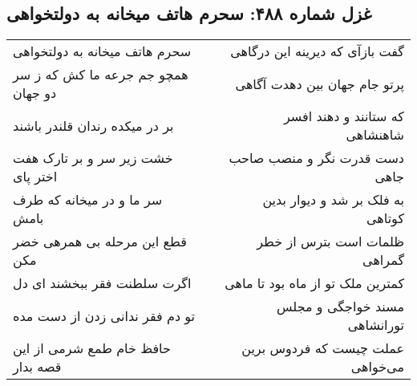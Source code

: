 \begin{center}
\section*{غزل شماره ۴۸۸: سحرم هاتف میخانه به دولتخواهی}
\label{sec:sh488}
\begin{longtable}{l p{0.5cm} r}
سحرم هاتف میخانه به دولتخواهی
&&
گفت بازآی که دیرینه این درگاهی
\\
همچو جم جرعه ما کش که ز سر دو جهان
&&
پرتو جام جهان بین دهدت آگاهی
\\
بر در میکده رندان قلندر باشند
&&
که ستانند و دهند افسر شاهنشاهی
\\
خشت زیر سر و بر تارک هفت اختر پای
&&
دست قدرت نگر و منصب صاحب جاهی
\\
سر ما و در میخانه که طرف بامش
&&
به فلک بر شد و دیوار بدین کوتاهی
\\
قطع این مرحله بی همرهی خضر مکن
&&
ظلمات است بترس از خطر گمراهی
\\
اگرت سلطنت فقر ببخشند ای دل
&&
کمترین ملک تو از ماه بود تا ماهی
\\
تو دم فقر ندانی زدن از دست مده
&&
مسند خواجگی و مجلس تورانشاهی
\\
حافظ خام طمع شرمی از این قصه بدار
&&
عملت چیست که فردوس برین می‌خواهی
\\
\end{longtable}
\end{center}
